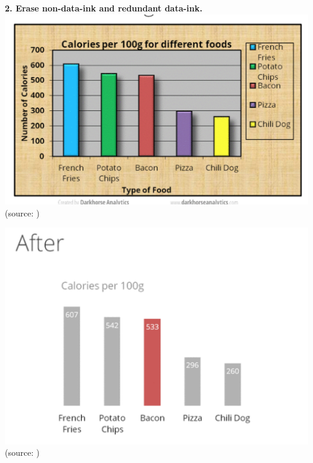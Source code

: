 \documentclass[]{book}
\theoremstyle{definition}
\theoremstyle{definition}
\theoremstyle{definition}
\theoremstyle{remark}
\begin{document}
\textbf{2. Erase non-data-ink and redundant data-ink.}\\
\includegraphics{images/Tufte_figure2.png} (source: \citep{appli_2017})

\includegraphics{images/Tufte_figure3.png} (source: \citep{appli_2017})
\end{document}
